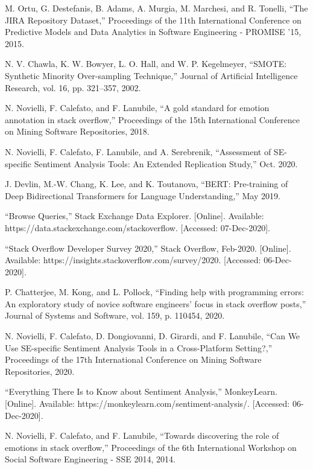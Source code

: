 \documentclass[conference]{IEEEtran}
\begin{document}
\begin{thebibliography}{00}
 M. Ortu, G. Destefanis, B. Adams, A. Murgia, M. Marchesi, and R. Tonelli, “The JIRA Repository Dataset,” Proceedings of the 11th International Conference on Predictive Models and Data Analytics in Software Engineering - PROMISE '15, 2015.

  N. V. Chawla, K. W. Bowyer, L. O. Hall, and W. P. Kegelmeyer, “SMOTE: Synthetic Minority Over-sampling Technique,” Journal of Artificial Intelligence Research, vol. 16, pp. 321–357, 2002. 

 N. Novielli, F. Calefato, and F. Lanubile, “A gold standard for emotion annotation in stack overflow,” Proceedings of the 15th International Conference on Mining Software Repositories, 2018. 

 N. Novielli, F. Calefato, F. Lanubile, and A. Serebrenik, “Assessment of SE-specific Sentiment Analysis Tools: An Extended Replication Study,” Oct. 2020.

 J. Devlin, M.-W. Chang, K. Lee, and K. Toutanova, “BERT: Pre-training of Deep Bidirectional Transformers for Language Understanding,” May 2019. 

 “Browse Queries,” Stack Exchange Data Explorer. [Online]. Available: https://data.stackexchange.com/stackoverflow. [Accessed: 07-Dec-2020]. 

 “Stack Overflow Developer Survey 2020,” Stack Overflow, Feb-2020. [Online]. Available: https://insights.stackoverflow.com/survey/2020. [Accessed: 06-Dec-2020]. 

 P. Chatterjee, M. Kong, and L. Pollock, “Finding help with programming errors: An exploratory study of novice software engineers’ focus in stack overflow posts,” Journal of Systems and Software, vol. 159, p. 110454, 2020. 

 N. Novielli, F. Calefato, D. Dongiovanni, D. Girardi, and F. Lanubile, “Can We Use SE-specific Sentiment Analysis Tools in a Cross-Platform Setting?,” Proceedings of the 17th International Conference on Mining Software Repositories, 2020. 

 “Everything There Is to Know about Sentiment Analysis,” MonkeyLearn. [Online]. Available: https://monkeylearn.com/sentiment-analysis/. [Accessed: 06-Dec-2020]. 

 N. Novielli, F. Calefato, and F. Lanubile, “Towards discovering the role of emotions in stack overflow,” Proceedings of the 6th International Workshop on Social Software Engineering - SSE 2014, 2014. 


\end{thebibliography}
\end{document}
